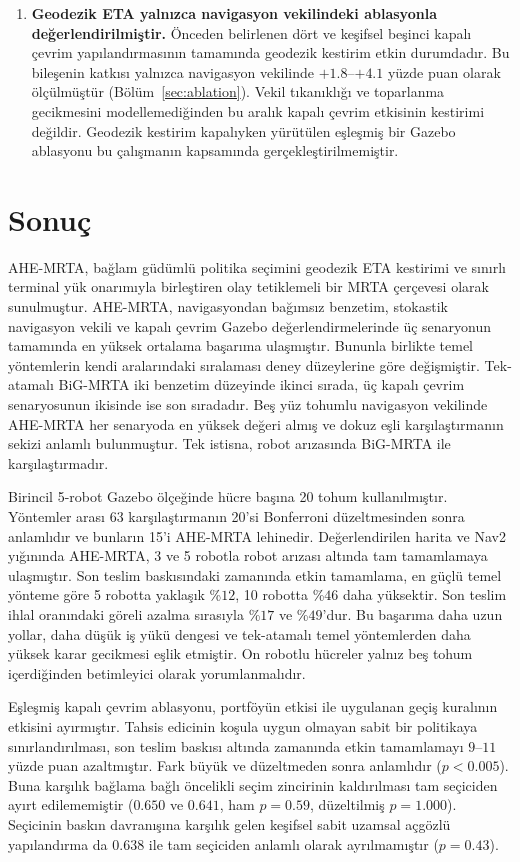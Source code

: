 \documentclass[10pt,letterpaper,onecolumn]{IEEEtran}
\begin{document}
\begin{enumerate}
  \item \textbf{Geodezik ETA yalnızca navigasyon vekilindeki ablasyonla
  değerlendirilmiştir.}
  Önceden belirlenen dört ve keşifsel beşinci kapalı çevrim yapılandırmasının
  tamamında geodezik kestirim etkin durumdadır. Bu bileşenin katkısı yalnızca
  navigasyon vekilinde $+1.8$--$+4.1$ yüzde puan olarak ölçülmüştür
  (Bölüm~\ref{sec:ablation}). Vekil tıkanıklığı ve toparlanma gecikmesini
  modellemediğinden bu aralık kapalı çevrim etkisinin kestirimi değildir.
  Geodezik kestirim kapalıyken yürütülen eşleşmiş bir Gazebo ablasyonu bu
  çalışmanın kapsamında gerçekleştirilmemiştir.
\end{enumerate}

\section{Sonuç}
\label{sec:conclusion}

AHE-MRTA, bağlam güdümlü politika seçimini geodezik ETA kestirimi ve sınırlı
terminal yük onarımıyla birleştiren olay tetiklemeli bir MRTA çerçevesi olarak
sunulmuştur. AHE-MRTA, navigasyondan bağımsız benzetim, stokastik navigasyon
vekili ve kapalı çevrim Gazebo değerlendirmelerinde üç senaryonun tamamında en
yüksek ortalama başarıma ulaşmıştır. Bununla birlikte temel yöntemlerin kendi
aralarındaki sıralaması deney düzeylerine göre değişmiştir. Tek-atamalı
BiG-MRTA iki benzetim düzeyinde ikinci sırada, üç kapalı çevrim senaryosunun
ikisinde ise son sıradadır. Beş yüz tohumlu navigasyon vekilinde AHE-MRTA her
senaryoda en yüksek değeri almış ve dokuz eşli karşılaştırmanın sekizi anlamlı
bulunmuştur. Tek istisna, robot arızasında BiG-MRTA ile karşılaştırmadır.

Birincil 5-robot Gazebo ölçeğinde hücre başına 20 tohum kullanılmıştır.
Yöntemler arası 63 karşılaştırmanın 20'si Bonferroni düzeltmesinden sonra
anlamlıdır ve bunların 15'i AHE-MRTA lehinedir. Değerlendirilen harita ve Nav2
yığınında AHE-MRTA, 3 ve 5 robotla robot arızası altında tam tamamlamaya
ulaşmıştır. Son teslim baskısındaki zamanında etkin tamamlama, en güçlü temel
yönteme göre 5 robotta yaklaşık \%$12$, 10 robotta \%$46$ daha yüksektir.
Son teslim ihlal oranındaki göreli azalma sırasıyla \%$17$ ve \%$49$'dur. Bu
başarıma daha uzun yollar, daha düşük iş yükü dengesi ve tek-atamalı temel
yöntemlerden daha yüksek karar gecikmesi eşlik etmiştir. On robotlu hücreler
yalnız beş tohum içerdiğinden betimleyici olarak yorumlanmalıdır.

Eşleşmiş kapalı çevrim ablasyonu, portföyün etkisi ile uygulanan geçiş kuralının
etkisini ayırmıştır. Tahsis edicinin koşula uygun olmayan sabit bir politikaya
sınırlandırılması, son teslim baskısı altında zamanında etkin tamamlamayı
$9$--$11$ yüzde puan azaltmıştır. Fark büyük ve düzeltmeden sonra anlamlıdır
($p<0.005$). Buna karşılık bağlama bağlı öncelikli seçim zincirinin kaldırılması
tam seçiciden
ayırt edilememiştir ($0.650$ ve $0.641$, ham $p{=}0.59$, düzeltilmiş
$p{=}1.000$). Seçicinin baskın davranışına karşılık gelen keşifsel sabit
uzamsal açgözlü yapılandırma da $0.638$ ile tam seçiciden anlamlı olarak
ayrılmamıştır ($p{=}0.43$).
\end{document}
